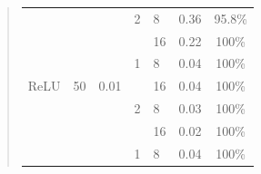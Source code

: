\documentclass{article}
\begin{document}
\begin{quote}
\begin{table}[h]
\begin{tabular}{|c|c|c|c|l|c|c|}
			&                       &                                                         & 2                                                       & 8                                                                              & 0.36                                                     & 95.8\%                                                  \\ \cline{5-7} 
			\multicolumn{1}{|l|}{}                                        & \multicolumn{1}{l|}{} & \multicolumn{1}{l|}{}                                   & \multicolumn{1}{l|}{}                                   & 16                                                                             & 0.22                                                   & 100\%                                                  \\ \hline
			&                       &                                                         & 1                                                       & 8                                                                              & 0.04                                                      & 100\%                                                   \\ \cline{5-7} 
			ReLU                                                          & 50                    & 0.01                                                    &                                                         & 16                                                                             & 0.04                                                      & 100\%                                                   \\ \cline{4-7} 
			&                       &                                                         & 2                                                       & 8                                                                              & 0.03                                                     & 100\%                                                   \\ \cline{5-7} 
			\multicolumn{1}{|l|}{}                                        & \multicolumn{1}{l|}{} & \multicolumn{1}{l|}{}                                   & \multicolumn{1}{l|}{}                                   & 16                                                                             & 0.02                                                      & 100\%                                                   \\ \hline
			&                       &                                                         & 1                                                       & 8                                                                              & 0.04                                                      & 100\%                                                   \\ \cline{5-7} 

\end{tabular}
\end{table}
\end{quote}
\end{document}
